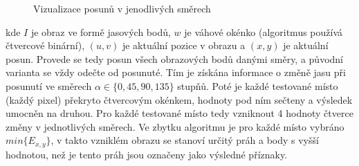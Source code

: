\begin{figure}[htp] 
	\caption{Vizualizace posunů v jenodlivých směrech} 	\label{Moravec_posun}
\end{figure}
	
kde  $I$ je obraz ve formě jasových bodů, $w$ je váhové okénko (algoritmus používá čtvercové binární), $(u,v)$ je aktuální pozice v obrazu a $(x,y)$ je aktuální posun. Provede se tedy posun všech obrazových bodů danými směry, a  původní varianta se vždy odečte od posunuté. Tím je získána informace o změně jasu při posunutí ve směrech  $\alpha \in \{0, 45, 90, 135\}$ stupňů. Poté je každé testované místo (každý pixel) překryto čtvercovým okénkem, hodnoty pod ním sečteny a výsledek umocněn na druhou. Pro každé testované místo tedy vzniknout 4 hodnoty čtverce změny v jednotlivých směrech.
Ve zbytku algoritmu je pro každé místo vybráno $min\{E_{x,y}\}$, v takto vzniklém obrazu se stanoví určitý práh a body s vyšší hodnotou, než je tento práh jsou označeny jako výsledné příznaky.

